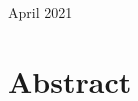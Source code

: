 \documentclass[a4paper,11, oneside]{article}
\begin{document}
	\begin{center}
		{\large April 2021}
	\end{center}		

	\newpage

%


%


\pagebreak

%


%

\section*{Abstract}



%

\pagebreak

\tableofcontents
\pagebreak
\listoffigures
\listoftables
\pagebreak
\newpage
\end{document}
